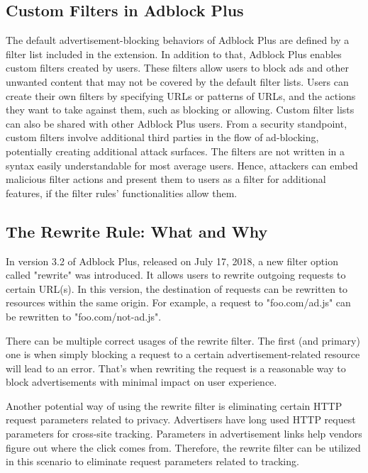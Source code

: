 \documentclass[conference]{IEEEtran}
\begin{document}
\subsection{Custom Filters in Adblock Plus}
The default advertisement-blocking behaviors of Adblock Plus are defined by a filter list included in the extension. In addition to that, Adblock Plus enables custom filters created by users. These filters allow users to block ads and other unwanted content that may not be covered by the default filter lists. Users can create their own filters by specifying URLs or patterns of URLs, and the actions they want to take against them, such as blocking or allowing. Custom filter lists can also be shared with other Adblock Plus users. From a security standpoint, custom filters involve additional third parties in the flow of ad-blocking, potentially creating additional attack surfaces. The filters are not written in a syntax easily understandable for most average users. Hence, attackers can embed malicious filter actions and present them to users as a filter for additional features, if the filter rules' functionalities allow them.

\subsection{The Rewrite Rule: What and Why}
In version 3.2 of Adblock Plus, released on July 17, 2018, a new filter option called "rewrite" was introduced. It allows users to rewrite outgoing requests to certain URL(s). In this version, the destination of requests can be rewritten to resources within the same origin. For example, a request to "foo.com/ad.js" can be rewritten to "foo.com/not-ad.js".

There can be multiple correct usages of the rewrite filter. The first (and primary) one is when simply blocking a request to a certain advertisement-related resource will lead to an error. That's when rewriting the request is a reasonable way to block advertisements with minimal impact on user experience.

Another potential way of using the rewrite filter is eliminating certain HTTP request parameters related to privacy. Advertisers have long used HTTP request parameters for cross-site tracking. Parameters in advertisement links help vendors figure out where the click comes from. Therefore, the rewrite filter can be utilized in this scenario to eliminate request parameters related to tracking.
\end{document}
